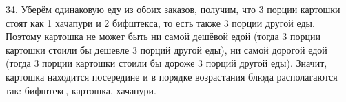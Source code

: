 34. Уберём одинаковую еду из обоих заказов, получим, что 3 порции картошки стоят как 1 хачапури и 2 бифштекса, то есть также 3 порции другой еды. Поэтому картошка не может быть ни самой дешёвой едой (тогда 3 порции картошки стоили бы дешевле 3 порций другой еды), ни самой дорогой едой (тогда 3 порции картошки стоили бы дороже 3 порций другой еды). Значит, картошка находится посередине и в порядке возрастания блюда располагаются так: бифштекс, картошка, хачапури.\\
